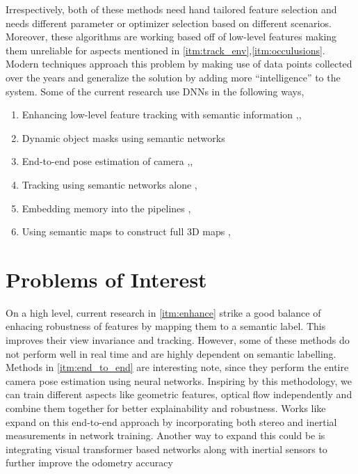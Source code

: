 \documentclass[conference]{IEEEtran}
\begin{document}
Irrespectively, both of these methods need hand tailored feature selection and needs different parameter or optimizer selection based on different scenarios. Moreover, these algorithms are working based off of low-level features making them unreliable for aspects mentioned in \ref{itm:track_env},\ref{itm:occulusions}. Modern techniques approach this problem by making use of data points collected over the years and generalize the solution by adding more ``intelligence'' to the system. Some of the current research use DNNs in the following ways,

\begin{enumerate}
    \item \label{itm:enhance} Enhancing low-level feature tracking with semantic information \cite{SalientDSO},\cite{DS-SLAM},\cite{VSO} 
    \item Dynamic object masks using semantic networks \cite{RGBDSlam}
    \item \label{itm:end_to_end} End-to-end pose estimation of camera \cite{semantic_autonomous_object},\cite{DeepVO},\cite{UnDeepVO}
    \item Tracking using semantic networks alone \cite{semantic only},\cite{semantic only vehicle}
    \item Embedding memory into the pipelines \cite{memory and refine},\cite{adaptive memory}
    \item Using semantic maps to construct full 3D maps \cite{SemanticSLAM},\cite{Dense3d}
\end{enumerate}

\section{Problems of Interest}
On a high level, current research in \ref{itm:enhance} strike a good balance of enhacing robustness of features by mapping them to a semantic label. This improves their view invariance and tracking. However, some of these methods do not perform well in real time and are highly dependent on semantic labelling. Methods in \ref{itm:end_to_end} are interesting note, since they perform the entire camera pose estimation using neural networks. Inspiring by this methodology, we can train different aspects like geometric features, optical flow independently and combine them together for better explainability and robustness. Works like \cite{DeepVIO} expand on this end-to-end approach by incorporating both stereo and inertial measurements in network training. Another way to expand this could be is integrating visual transformer based networks along with inertial sensors to further improve the odometry accuracy
\end{document}
